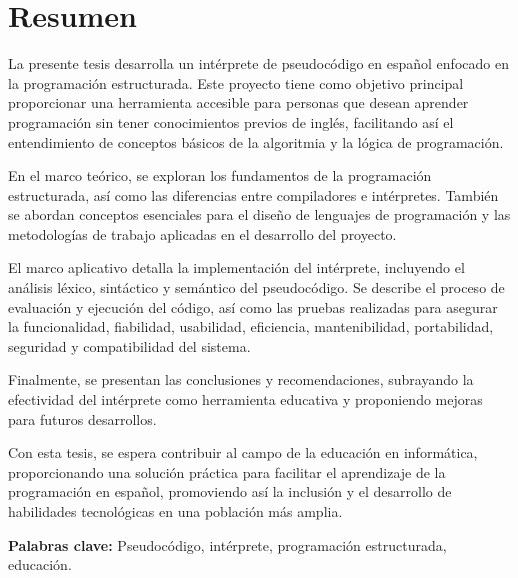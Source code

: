 \chapter*{Resumen}

La presente tesis desarrolla un intérprete de pseudocódigo en español enfocado en la programación estructurada. Este proyecto tiene como objetivo principal proporcionar una herramienta accesible para personas que desean aprender programación sin tener conocimientos previos de inglés, facilitando así el entendimiento de conceptos básicos de la algoritmia y la lógica de programación.

En el marco teórico, se exploran los fundamentos de la programación estructurada, así como las diferencias entre compiladores e intérpretes. También se abordan conceptos esenciales para el diseño de lenguajes de programación y las metodologías de trabajo aplicadas en el desarrollo del proyecto.

El marco aplicativo detalla la implementación del intérprete, incluyendo el análisis léxico, sintáctico y semántico del pseudocódigo. Se describe el proceso de evaluación y ejecución del código, así como las pruebas realizadas para asegurar la funcionalidad, fiabilidad, usabilidad, eficiencia, mantenibilidad, portabilidad, seguridad y compatibilidad del sistema.

Finalmente, se presentan las conclusiones y recomendaciones, subrayando la efectividad del intérprete como herramienta educativa y proponiendo mejoras para futuros desarrollos.

Con esta tesis, se espera contribuir al campo de la educación en informática, proporcionando una solución práctica para facilitar el aprendizaje de la programación en español, promoviendo así la inclusión y el desarrollo de habilidades tecnológicas en una población más amplia.

\textbf{Palabras clave:} Pseudocódigo, intérprete, programación estructurada, educación.
